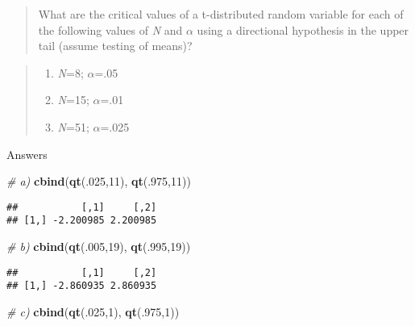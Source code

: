 \documentclass[]{article}
\newenvironment{Shaded}{\begin{snugshade}}{\end{snugshade}}
\newcommand{\KeywordTok}[1]{\textcolor[rgb]{0.13,0.29,0.53}{\textbf{#1}}}
\newcommand{\DecValTok}[1]{\textcolor[rgb]{0.00,0.00,0.81}{#1}}
\newcommand{\CommentTok}[1]{\textcolor[rgb]{0.56,0.35,0.01}{\textit{#1}}}
\newcommand{\NormalTok}[1]{#1}
\providecommand{\tightlist}{%
  \setlength{\itemsep}{0pt}\setlength{\parskip}{0pt}}
\begin{document}
\begin{quote}
What are the critical values of a t-distributed random variable for each
of the following values of \emph{N} and \(\alpha\) using a directional
hypothesis in the upper tail (assume testing of means)?
\end{quote}

\begin{quote}
\begin{enumerate}
\def\labelenumi{\alph{enumi}.}
\setcounter{enumi}{3}
\tightlist
\item
  \emph{N}=8; \(\alpha\)=.05
\item
  \emph{N}=15; \(\alpha\)=.01
\item
  \emph{N}=51; \(\alpha\)=.025
\end{enumerate}
\end{quote}

Answers

\begin{Shaded}
\begin{Highlighting}[]
\CommentTok{# a)}
\KeywordTok{cbind}\NormalTok{(}\KeywordTok{qt}\NormalTok{(.}\DecValTok{025}\NormalTok{,}\DecValTok{11}\NormalTok{), }\KeywordTok{qt}\NormalTok{(.}\DecValTok{975}\NormalTok{,}\DecValTok{11}\NormalTok{))}
\end{Highlighting}
\end{Shaded}

\begin{verbatim}
##           [,1]     [,2]
## [1,] -2.200985 2.200985
\end{verbatim}

\begin{Shaded}
\begin{Highlighting}[]
\CommentTok{# b)}
\KeywordTok{cbind}\NormalTok{(}\KeywordTok{qt}\NormalTok{(.}\DecValTok{005}\NormalTok{,}\DecValTok{19}\NormalTok{), }\KeywordTok{qt}\NormalTok{(.}\DecValTok{995}\NormalTok{,}\DecValTok{19}\NormalTok{))}
\end{Highlighting}
\end{Shaded}

\begin{verbatim}
##           [,1]     [,2]
## [1,] -2.860935 2.860935
\end{verbatim}

\begin{Shaded}
\begin{Highlighting}[]
\CommentTok{# c)}
\KeywordTok{cbind}\NormalTok{(}\KeywordTok{qt}\NormalTok{(.}\DecValTok{025}\NormalTok{,}\DecValTok{1}\NormalTok{), }\KeywordTok{qt}\NormalTok{(.}\DecValTok{975}\NormalTok{,}\DecValTok{1}\NormalTok{))}
\end{Highlighting}
\end{Shaded}
\end{document}

